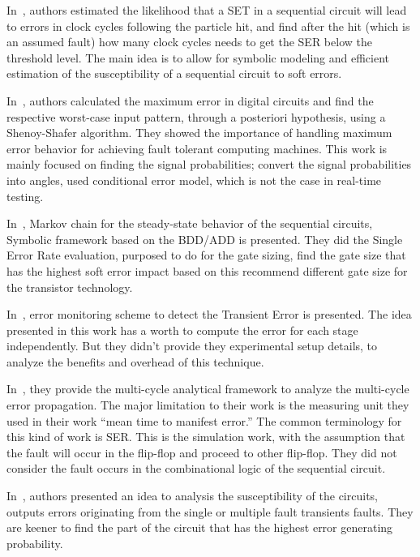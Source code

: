 In~\citep{miskov2007mars},  authors estimated the likelihood that a SET in a sequential circuit will lead to errors
in clock cycles following the particle hit, and find after the hit (which is an assumed fault) how many clock
cycles needs to get the SER below the threshold level. The main idea is to allow for symbolic modeling and efficient estimation of the susceptibility of a sequential circuit to soft errors.



In~\citep{lingasubramanian2010probabilistic}, authors calculated the maximum error in digital circuits and find the respective
worst-case input pattern, through a posteriori hypothesis, using a Shenoy-Shafer algorithm.
They showed the importance of handling maximum error behavior for achieving fault tolerant
computing machines. This work is mainly focused on finding the signal probabilities; convert the signal
probabilities into angles, used conditional error model, which is not the case in real-time testing.


In~\citep{miskov2008modeling}, Markov chain for the steady-state behavior of the sequential circuits, Symbolic framework
based on the BDD/ADD is presented. They did the Single Error Rate  evaluation, purposed to do
for the gate sizing, find the gate size that has the highest soft error impact based on this recommend
different gate size for the transistor technology. 
 




In~\citep{das2007monitoring}, error monitoring scheme to detect the Transient Error is presented. The idea presented in this work has a worth to compute the error for each stage
independently. But they didn't provide they experimental setup details, to analyze the benefits and overhead of this technique.

In~\citep{asadi2005soft}, they provide the multi-cycle analytical framework to analyze the multi-cycle error
propagation. The major limitation to their work is the measuring unit they used in their work “mean time
to manifest error.” The common terminology for this kind of work is SER. This is the simulation work,
with the assumption that the fault will occur in the flip-flop and proceed to other flip-flop. They did not
consider the fault occurs in the combinational logic of the sequential circuit.

In~\citep{miskov2010multiple}, authors presented an idea to analysis the susceptibility of the circuits, outputs
errors originating from the single or multiple fault transients faults. They are keener to find the part of
the circuit that has the highest error generating probability.






